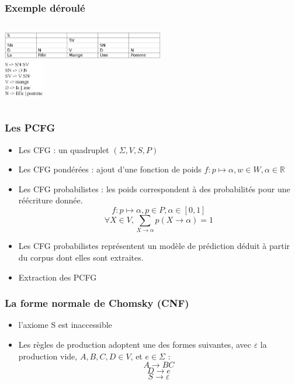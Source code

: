 \documentclass[table]{beamer}
\begin{document}
\begin{frame}
\frametitle{Exemple déroulé}
  \begin{columns}
  \begin{column}{0.6\textwidth}
     \includegraphics[width=200pt,]{10.jpeg}  \\
  \includegraphics[width=50pt,]{11.jpeg}  
  \end{column}
  \end{columns}
\end{frame}


\begin{frame}
 \frametitle{Les PCFG}
 \begin{itemize}
  \item<1-5>{Les CFG : un quadruplet $(\Sigma,V,S,P)$ }
  \item<2-5>{Les CFG pondérées : ajout d'une fonction de poids $ f : p \mapsto \alpha, w \in W, \alpha \in \mathbb{R} $ }
  \item<3-5>{Les CFG probabilistes : les poids correspondent à des probabilités pour une réécriture donnée.  
  $$ f : p \mapsto \alpha, p \in P, \alpha \in [0,1]$$ $$ \forall X \in V, \sum_{X\to\alpha}p(X\to\alpha)=1 $$ }
  \item<4-5>{Les CFG probabilistes représentent un modèle de prédiction déduit à partir du corpus dont elles sont extraites.}
  \item<5-5>{Extraction des PCFG}
 \end{itemize}

\end{frame}



\begin{frame} 
\frametitle{La forme normale de Chomsky (CNF)}
 \begin{itemize}
 \item {l'axiome S est inaccessible}
 \item {Les règles de production adoptent une des formes suivantes, avec  $\varepsilon$ la production vide, $A,B,C,D \in V$, et $e \in \Sigma$ : 
     $$A \rightarrow B C $$ 
     $$ D \rightarrow e $$
     $$ S \rightarrow \varepsilon$$ }

 \end{itemize}

\end{frame}
\end{document}
